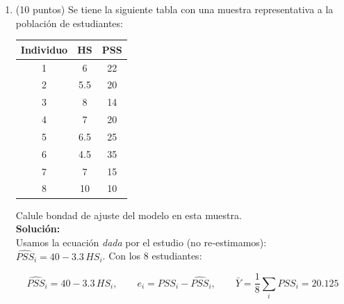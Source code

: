 \documentclass[10pt,a4paper]{article}
\begin{document}
\begin{enumerate}
\begin{enumerate}
\begin{enumerate}
\end{enumerate}
    \item (10 puntos) Se tiene la siguiente tabla con una muestra representativa a la población de estudiantes:
    \begin{center}
        \begin{table}[H]
            \centering
            \begin{tabular}{|c|c|c|}
            \hline
                Individuo & HS & PSS \\
                \hline 
                1         & 6   &  22   \\
                2         & 5.5 &  20   \\
                3         & 8   &  14   \\
                4         & 7   &  20   \\
                5         & 6.5 &  25   \\
                6         & 4.5 &  35   \\
                7         & 7   &  15   \\
                8         & 10  &  10   \\
                \hline
            \end{tabular}
        \end{table}
    \end{center}
    Calule bondad de ajuste del modelo en esta muestra.
    \\
    \textbf{Solución:}
    \\
 
    Usamos la ecuación \emph{dada} por el estudio (no re‐estimamos): $\widehat{PSS}_i=40-3.3\,HS_i$.
Con los 8 estudiantes:

\[
\widehat{PSS}_i = 40 - 3.3\,HS_i,\qquad 
e_i = PSS_i - \widehat{PSS}_i,\qquad 
\bar Y = \frac{1}{8}\sum_i PSS_i = 20.125
\]


\end{enumerate}
\end{enumerate}
\end{document}
